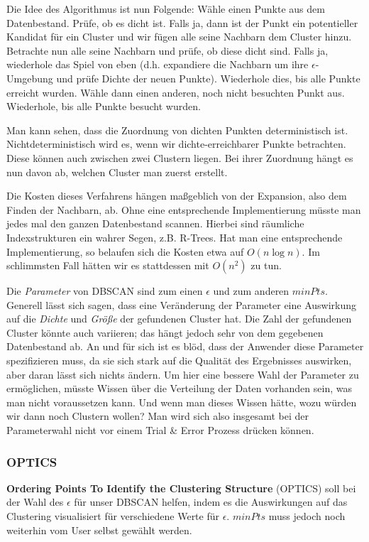Die Idee des Algorithmus ist nun Folgende: Wähle einen Punkte aus
dem Datenbestand. Prüfe, ob es dicht ist. Falls ja, dann ist der Punkt
ein potentieller Kandidat für ein Cluster und wir fügen alle seine Nachbarn
dem Cluster hinzu. Betrachte nun alle seine Nachbarn und prüfe, ob diese
dicht sind. Falls ja, wiederhole das Spiel von eben (d.h. expandiere die
Nachbarn um ihre \(\epsilon\)- Umgebung und prüfe Dichte der neuen
Punkte). Wiederhole dies, bis alle Punkte erreicht wurden. Wähle dann
einen anderen, noch nicht besuchten Punkt aus. Wiederhole, bis alle Punkte
besucht wurden.

Man kann sehen, dass die Zuordnung von dichten Punkten deterministisch
ist. Nichtdeterministisch wird es, wenn wir dichte-erreichbarer Punkte
betrachten. Diese können auch zwischen zwei Clustern liegen. Bei ihrer
Zuordnung hängt es nun davon ab, welchen Cluster man zuerst erstellt.

Die Kosten dieses Verfahrens hängen maßgeblich von der Expansion, also
dem Finden der Nachbarn, ab. Ohne eine entsprechende Implementierung
müsste man jedes mal den ganzen Datenbestand scannen. Hierbei sind
räumliche Indexstrukturen ein wahrer Segen, z.B. R-Trees. Hat man eine
entsprechende Implementierung, so belaufen sich die Kosten etwa auf
\(O(n \log n)\). Im schlimmsten Fall hätten wir es stattdessen mit
\(O(n^2)\) zu tun.

Die \textit{Parameter} von DBSCAN sind zum einen \(\epsilon\) und
zum anderen \(minPts\). Generell lässt sich sagen, dass eine Veränderung
der Parameter eine Auswirkung auf die \textit{Dichte} und
\textit{Größe} der gefundenen Cluster hat. Die Zahl der gefundenen Cluster
könnte auch variieren; das hängt jedoch sehr von dem gegebenen Datenbestand ab.
An und für sich ist es blöd, dass der Anwender diese Parameter spezifizieren 
muss, da sie sich stark auf die Qualität des Ergebnisses auswirken, aber
daran lässt sich nichts ändern. Um hier eine bessere Wahl der Parameter
zu ermöglichen, müsste Wissen über die Verteilung der Daten vorhanden
sein, was man nicht voraussetzen kann. Und wenn man dieses Wissen hätte,
wozu würden wir dann noch Clustern wollen? Man wird sich also insgesamt bei
der Parameterwahl nicht vor einem Trial \& Error Prozess drücken können.

\subsubsection{OPTICS}
\textbf{Ordering Points To Identify the Clustering Structure} (OPTICS) 
soll bei der Wahl des \(\epsilon\) für unser DBSCAN helfen, indem es
die Auswirkungen auf das Clustering visualisiert für verschiedene Werte für
\(\epsilon\). \(minPts\) muss jedoch noch weiterhin vom User selbst
gewählt werden.

